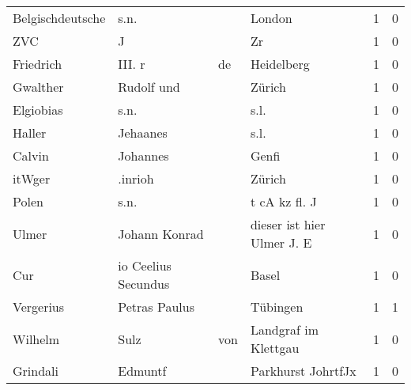 \begin{center}
\begin{tiny}
\begin{longtabu}{llllrr}
         Belgischdeutsche &                               s.n. &             &                                      London &          1 &         0 \\
                      ZVC &                                  J &             &                                          Zr &          1 &         0 \\
                Friedrich &                            III.  r &          de &                                  Heidelberg &          1 &         0 \\
                 Gwalther &                         Rudolf und &             &                                      Zürich &          1 &         0 \\
                Elgiobias &                               s.n. &             &                                        s.l. &          1 &         0 \\
                   Haller &                           Jehaanes &             &                                        s.l. &          1 &         0 \\
                   Calvin &                           Johannes &             &                                       Genfi &          1 &         0 \\
                   itWger &                            .inrioh &             &                                      Zürich &          1 &         0 \\
                    Polen &                               s.n. &             &                               t cA kz fl. J &          1 &         0 \\
                    Ulmer &                      Johann Konrad &             &                  dieser ist hier Ulmer J. E &          1 &         0 \\
                      Cur &                io Ceelius Secundus &             &                                       Basel &          1 &         0 \\
                Vergerius &                      Petras Paulus &             &                                    Tübingen &          1 &         1 \\
                  Wilhelm &                               Sulz &         von &                        Landgraf im Klettgau &          1 &         0 \\
                 Grindali &                            Edmuntf &             &                          Parkhurst JohrtfJx &          1 &         0 \\

\end{longtabu}
\end{tiny}
\end{center}
